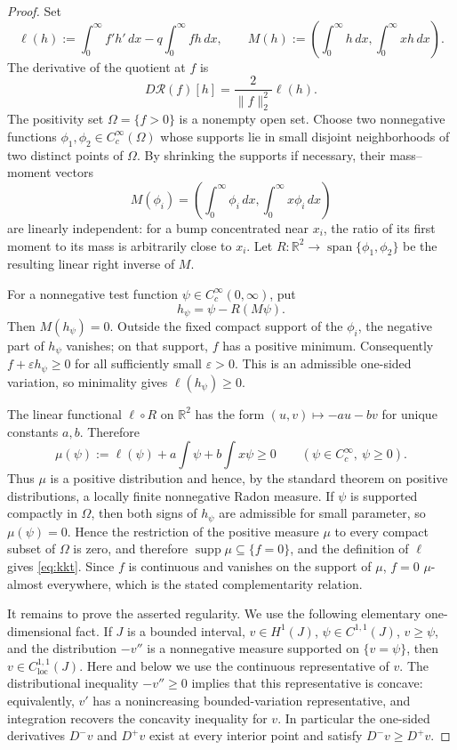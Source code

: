 \documentclass[11pt]{article}
\theoremstyle{definition}
\theoremstyle{remark}
\newcommand{\Rcal}{\mathcal R}
\begin{document}
\begin{proof}
Set
\[
 \ell(h):=\int_0^\infty f'h'\,dx-q\int_0^\infty fh\,dx,
 \qquad
 M(h):=\left(\int_0^\infty h\,dx,
                 \int_0^\infty xh\,dx\right).
\]
The derivative of the quotient at $f$ is
\[
 D\Rcal(f)[h]=\frac{2}{\|f\|_2^2}\ell(h).
\]
The positivity set $\Omega=\{f>0\}$ is a nonempty open set. Choose two
nonnegative functions $\phi_1,\phi_2\in C_c^\infty(\Omega)$ whose supports lie
in small disjoint neighborhoods of two distinct points of $\Omega$. By
shrinking the supports if necessary, their mass--moment vectors
\[
 M(\phi_i)=\left(\int_0^\infty\phi_i\,dx,
                       \int_0^\infty x\phi_i\,dx\right)
\]
are linearly independent: for a bump concentrated near $x_i$, the ratio of
its first moment to its mass is arbitrarily close to $x_i$. Let
$R:\mathbb R^2\to\operatorname{span}\{\phi_1,\phi_2\}$ be the resulting
linear right inverse of $M$.

For a nonnegative test function $\psi\in C_c^\infty(0,\infty)$, put
\[
 h_\psi=\psi-R(M\psi).
\]
Then $M(h_\psi)=0$. Outside the fixed compact support of the $\phi_i$, the
negative part of $h_\psi$ vanishes; on that support, $f$ has a positive
minimum. Consequently $f+\varepsilon h_\psi\geq0$ for all sufficiently small
$\varepsilon>0$. This is an admissible one-sided variation, so minimality gives
$\ell(h_\psi)\geq0$.

The linear functional $\ell\circ R$ on $\mathbb R^2$ has the form
$(u,v)\mapsto-au-bv$ for unique constants $a,b$. Therefore
\[
 \mu(\psi):=\ell(\psi)+a\int\psi+b\int x\psi\geq0
 \qquad(\psi\in C_c^\infty,\ \psi\geq0).
\]
Thus $\mu$ is a positive distribution and hence, by the standard theorem on
positive distributions, a locally finite
nonnegative Radon measure. If $\psi$ is supported compactly in $\Omega$, then
both signs of $h_\psi$ are admissible for small parameter, so
$\mu(\psi)=0$. Hence the restriction of the positive measure $\mu$ to every
compact subset of $\Omega$ is zero, and therefore
$\operatorname{supp}\mu\subseteq\{f=0\}$, and the definition of $\ell$ gives
\eqref{eq:kkt}. Since $f$ is continuous and vanishes on the support of $\mu$,
$f=0$ $\mu$-almost everywhere, which is the stated complementarity relation.

It remains to prove the asserted regularity. We use the following elementary
one-dimensional fact. If $J$ is a bounded interval, $v\in H^1(J)$,
$\psi\in C^{1,1}(J)$, $v\geq\psi$, and the distribution $-v''$ is a
nonnegative measure supported on $\{v=\psi\}$, then
$v\in C^{1,1}_{\mathrm{loc}}(J)$. Here and below we use the continuous
representative of $v$. The distributional inequality $-v''\geq0$ implies that
this representative is concave: equivalently, $v'$ has a nonincreasing
bounded-variation representative, and integration recovers the concavity
inequality for $v$. In particular the one-sided derivatives $D^-v$ and
$D^+v$ exist at every interior point and satisfy $D^-v\geq D^+v$.


\end{proof}
\end{document}
